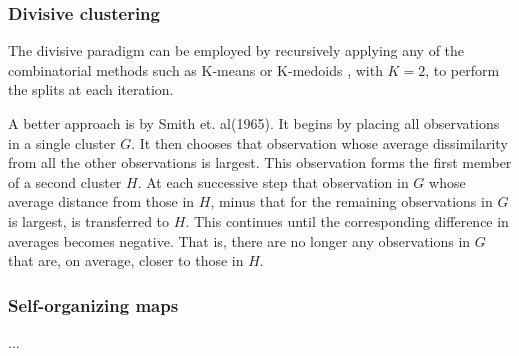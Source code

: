 \subsubsection{Divisive clustering}
The divisive paradigm can be employed by recursively applying any of the combinatorial methods such as K-means or K-medoids , with $K = 2$, to perform the splits at each iteration.

A better approach is by Smith et. al(1965). It begins by placing all observations in a single cluster $G$. It then chooses that observation whose average dissimilarity from all the other observations is largest. This observation forms the first member of a second cluster $H$. At each successive step that observation in $G$ whose average distance from those in $H$, minus that for the remaining observations in $G$ is largest, is transferred to $H$. This continues until the corresponding difference in averages becomes negative. That is, there are no longer any observations in $G$ that are, on average, closer to those in $H$.

\subsubsection{Self-organizing maps}
...

